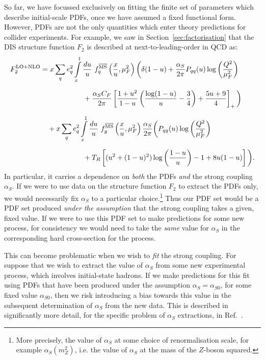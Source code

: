 \documentclass[withindex,glossary]{cam-thesis}
\begin{document}
So far, we have focussed exclusively on fitting the finite set of parameters which describe initial-scale PDFs, once we have assumed a fixed functional form. However, PDFs are not the only quantities which enter theory predictions for collider experiments. For example, we saw in Section~\ref{sec:factorisation} that the DIS structure function $F_2$ is described at next-to-leading-order in QCD as:
\begin{align}
F_2^{\text{LO+NLO}} &= x \sum_{q} e_q^2 \int\limits_{x}^{1} \frac{du}{u}\ f^{\overline{\text{MS}}}_q\left(\frac{x}{u},\mu_F^2\right)   \bigg( \delta(1-u) + \frac{\alpha_S}{2\pi} P_{qq}(u) \log\left( \frac{Q^2}{\mu_F^2} \right) \notag\\[1.5ex]
&\qquad\qquad\qquad + \frac{\alpha_S C_F}{2\pi} \left[ \frac{1+u^2}{1-u} \left( \frac{\log(1-u)}{u} - \frac{3}{4} \right) + \frac{5u + 9}{4}\right]_+\bigg) \notag \\[1.5ex]
&\quad + x \sum_{q} e_q^2 \int\limits_{x}^{1} \frac{du}{u}\ f^{\overline{\text{MS}}}_g\left( \frac{x}{u}, \mu_F^2\right) \frac{\alpha_S}{2\pi} \bigg( P_{qg}(u) \log\left( \frac{Q^2}{\mu_F^2}\right) \notag \\[1.5ex]
&\qquad\qquad\qquad + T_R \left[ (u^2 + (1-u)^2) \log\left( \frac{1-u}{u} \right) - 1 + 8u(1-u)\right] \bigg).
\end{align}
In particular, it carries a dependence on \textit{both} the PDFs \textit{and} the strong coupling $\alpha_S$. If we were to use data on the structure function $F_2$ to extract the PDFs only, we would necessarily fix $\alpha_S$ to a particular choice.\footnote{More precisely, the value of $\alpha_S$ at some choice of renormalisation scale, for example $\alpha_S(m_Z^2)$, i.e. the value of $\alpha_S$ at the mass of the $Z$-boson squared.} Thus our PDF set would be a PDF set produced \textit{under the assumption} that the strong coupling takes a given, fixed value. If we were to use this PDF set to make predictions for some new process, for consistency we would need to take the \textit{same} value for $\alpha_S$ in the corresponding hard cross-section for the process.

This can become problematic when we wish to \textit{fit} the strong coupling. For suppose that we wish to extract the value of $\alpha_S$ from some new experimental process, which involves initial-state hadrons. If we make predictions for this fit using PDFs that have been produced under the assumption $\alpha_S = \alpha_{S0}$, for some fixed value $\alpha_{S0}$, then we risk introducing a bias towards this value in the subsequent determination of $\alpha_S$ from the new data. This is described in significantly more detail, for the specific problem of $\alpha_S$ extractions, in Ref.~\cite{Forte:2020pyp}. \\
\end{document}
